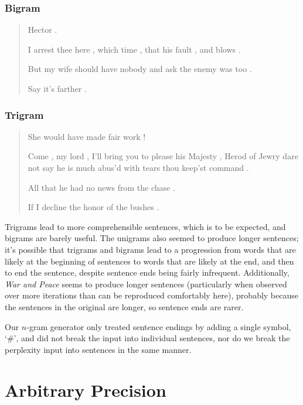 \documentclass{article}
\begin{document}
		\subsubsection*{Bigram}
			
			\begin{quote}
			
			Hector .

			I arrest thee here , which time , that his fault , and blows .

			But my wife should have nobody and ask the enemy was too .

			Say it's farther .

			\end{quote}

		\subsubsection*{Trigram}

			\begin{quote}
			
			She would have made fair work !

			Come , my lord , I'll bring you to please his Majesty , Herod of
			Jewry dare not say he is much abus'd with tears thou keep'st command
			.

			All that he had no news from the chase .

			If I decline the honor of the bushes .

			\end{quote}

		Trigrams lead to more comprehensible sentences, which is to be expected,
		and bigrams are barely useful.  The unigrams also seemed to produce
		longer sentences; it's possible that trigrams and bigrams lead to a
		progression from words that are likely at the beginning of sentences to
		words that are likely at the end, and then to end the sentence, despite
		sentence ends being fairly infrequent.  Additionally, \textit{War and
		Peace} seems to produce longer sentences (particularly when observed
		over more iterations than can be reproduced comfortably here), probably
		because the sentences in the original are longer, so sentence ends are
		rarer.

		Our $n$-gram generator only treated sentence endings by adding a single
		symbol, `\#', and did not break the input into individual sentences, nor
		do we break the perplexity input into sentences in the same manner.
	
	\section*{Arbitrary Precision}
\end{document}
